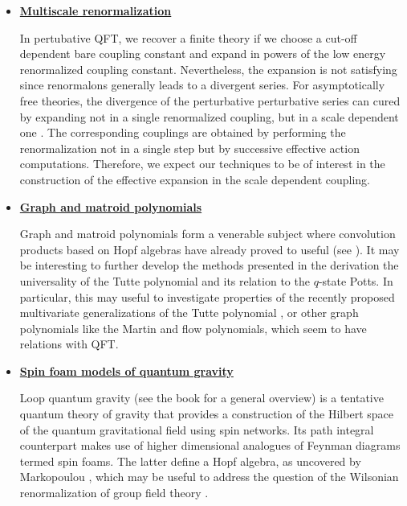 \documentclass[10pt,here,feynmf]{article}
\begin{document}
\begin{itemize} 
\item
\underline{\bf Multiscale renormalization}

In pertubative QFT, we recover a finite theory if we choose a cut-off dependent bare coupling constant and expand in powers of the low energy renormalized coupling constant. Nevertheless, the expansion is not satisfying since renormalons generally leads to a divergent series. For asymptotically free theories, the divergence of the perturbative perturbative series can cured by expanding not in a single renormalized coupling, but in a scale dependent one \cite{constructive}. The corresponding couplings are obtained by performing the renormalization not in a single step but by successive effective action computations. Therefore, we expect our techniques to be of interest in the construction of the effective expansion in the scale dependent coupling. 

\item
\underline{\bf Graph and matroid polynomials}

Graph and matroid polynomials form a venerable subject where convolution products based on Hopf algebras have already proved to useful (see \cite{KRS}). It may be interesting to further develop the methods presented in the derivation  the universality of the Tutte polynomial and its relation to the $q$-state Potts. In particular, this may useful to investigate properties of the recently proposed multivariate generalizations of the Tutte polynomial \cite{sokal}, or other graph polynomials like the Martin and flow polynomials, which seem to have relations with QFT.   


\item
\underline{\bf Spin foam models of quantum gravity}

Loop quantum gravity (see the book \cite{rovelli} for a general overview) is a tentative quantum theory of gravity that provides a construction of the Hilbert space of the quantum gravitational field using spin networks. Its path integral counterpart makes use of higher dimensional analogues of Feynman diagrams termed spin foams. The latter define a Hopf algebra, as uncovered by Markopoulou \cite{Fotini}, which may be useful to address the question of  the Wilsonian renormalization of group field theory \cite{oriti}.


\end{itemize}



\noindent
\end{document}
